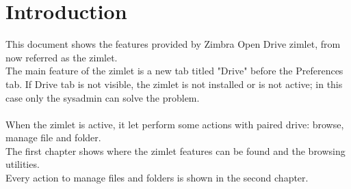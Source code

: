 \chapter{Introduction}
This document shows the features provided by Zimbra Open Drive zimlet, from now referred as the zimlet.\\
The main feature of the zimlet is a new tab titled "Drive" before the Preferences tab.
If Drive tab is not visible, the zimlet is not installed or is not active;
in this case only the sysadmin can solve the problem.\\
\\
When the zimlet is active, it let perform some actions with paired drive: browse, manage file and folder.\\
The first chapter shows where the zimlet features can be found and the browsing utilities.\\
Every action to manage files and folders is shown in the second chapter.